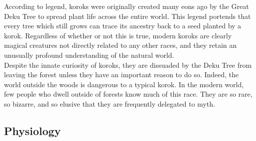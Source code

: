 \documentclass[10pt,twoside,twocolumn,openany]{book}
\begin{document}
According to legend, koroks were originally created many eons ago by the Great Deku Tree to spread plant life across the entire world. This legend portends that every tree which still grows can trace its ancestry back to a seed planted by a korok. Regardless of whether or not this is true, modern koroks are clearly magical creatures not directly related to any other races, and they retain an unusually profound understanding of the natural world.\\
Despite the innate curiosity of koroks, they are dissuaded by the Deku Tree from leaving the forest unless they have an important reason to do so. Indeed, the world outside the woods is dangerous to a typical korok. In the modern world, few people who dwell outside of forests know much of this race. They are so rare, so bizarre, and so elusive that they are frequently delegated to myth.

\subsection{Physiology}
\end{document}

